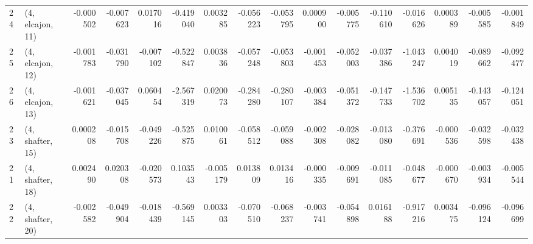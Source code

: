 \begin{tabular}{llrrrrrrrrrrrrrr}
24 &  (4, elcajon, 11) &  -0.000502 & -0.007623 &  0.017016 &  -0.419040 &  0.003285 &  -0.056223 & -0.053795 &  0.000900 & -0.005775 & -0.110610 &  -0.016626 &  0.000389 & -0.005585 & -0.001849 \\
25 &  (4, elcajon, 12) &  -0.001783 & -0.031790 & -0.007102 &  -0.522847 &  0.003836 &  -0.057248 & -0.053803 & -0.001453 & -0.052003 & -0.037386 &  -1.043247 &  0.004019 & -0.089662 & -0.092477 \\
26 &  (4, elcajon, 13) &  -0.001621 & -0.037045 &  0.060454 &  -2.567319 &  0.020073 &  -0.284280 & -0.280107 & -0.003384 & -0.051372 & -0.147733 &  -1.536702 &  0.005135 & -0.143057 & -0.124051 \\
23 &  (4, shafter, 15) &   0.000208 & -0.015708 & -0.049226 &  -0.525875 &  0.010061 &  -0.058512 & -0.059088 & -0.002308 & -0.028082 & -0.013080 &  -0.376691 & -0.000536 & -0.032598 & -0.032438 \\
21 &  (4, shafter, 18) &   0.002490 &  0.020308 & -0.020573 &   0.103543 & -0.005179 &   0.013809 &  0.013416 & -0.000335 & -0.009691 & -0.011085 &  -0.048677 & -0.000670 & -0.003934 & -0.005544 \\
22 &  (4, shafter, 20) &  -0.002582 & -0.049904 & -0.018439 &  -0.569145 &  0.003303 &  -0.070510 & -0.068237 & -0.003741 & -0.054898 &  0.016188 &  -0.917216 &  0.003475 & -0.096124 & -0.096699 \\
\bottomrule
\end{tabular}

